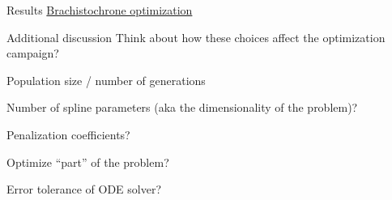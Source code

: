 \documentclass[presentation]{beamer}
\begin{document}
\begin{frame}[label={sec:orga66806c}]{Results}
\href{file:///Users/tp5/code/optex/brachistochrone.mp4}{Brachistochrone optimization}
\end{frame}
\begin{frame}[label={sec:orgd03d582}]{Additional discussion}
Think about how these choices affect the optimization campaign?
\begin{block}{Population size / number of generations}
\end{block}
\begin{block}{Number of spline parameters (aka the dimensionality of the problem)?}
\end{block}
\begin{block}{Penalization coefficients?}
\end{block}
\begin{block}{Optimize ``part'' of the problem?}
\end{block}
\begin{block}{Error tolerance of ODE solver?}
\end{block}
\end{frame}
\end{document}
